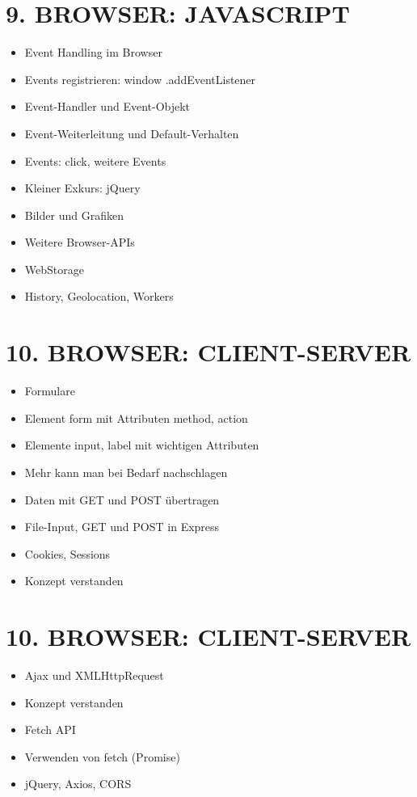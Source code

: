 \section*{9. BROWSER: JAVASCRIPT}
\begin{itemize}
  \item Event Handling im Browser
  \item Events registrieren: window .addEventListener
  \item Event-Handler und Event-Objekt
  \item Event-Weiterleitung und Default-Verhalten
  \item Events: click, weitere Events
  \item Kleiner Exkurs: jQuery
  \item Bilder und Grafiken
  \item Weitere Browser-APIs
  \item WebStorage
  \item History, Geolocation, Workers
\end{itemize}

\section*{10. BROWSER: CLIENT-SERVER}
\begin{itemize}
  \item Formulare
  \item Element form mit Attributen method, action
  \item Elemente input, label mit wichtigen Attributen
  \item Mehr kann man bei Bedarf nachschlagen
  \item Daten mit GET und POST übertragen
  \item File-Input, GET und POST in Express
  \item Cookies, Sessions
  \item Konzept verstanden
\end{itemize}

\section*{10. BROWSER: CLIENT-SERVER}
\begin{itemize}
  \item Ajax und XMLHttpRequest
  \item Konzept verstanden
  \item Fetch API
  \item Verwenden von fetch (Promise)
  \item jQuery, Axios, CORS
\end{itemize}

